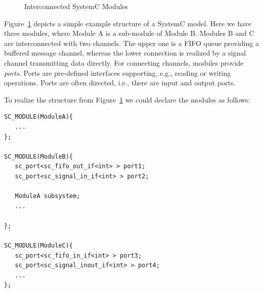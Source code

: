 \documentclass{template/openetcs_article}
\begin{document}
\begin{figure}
\begin{center}
\end{center}

\caption{Interconnected SystemC Modules}
\label{fig:modulestructure}
\end{figure}

Figure~\ref{fig:modulestructure} depicts a simple example structure of a SystemC model. Here we have three modules, where Module A is a sub-module of Module B. Modules B and C are interconnected with two channels. The upper one is a FIFO queue providing a buffered message channel, whereas the lower connection is realized by a signal channel transmitting data directly. For connecting channels, modules provide \emph{ports}. Ports are pre-defined interfaces supporting, e.g., reading or writing operations. Ports are often directed, i.e., there are input and output ports.

To realize the structure from Figure~\ref{fig:modulestructure} we could declare the modules as follows:

\lstset{language=C++, numbers=left, numberstyle=\tiny,showstringspaces=false} 
{\small
\begin{lstlisting}
SC_MODULE(ModuleA){
   ...
};

SC_MODULE(ModuleB){
   sc_port<sc_fifo_out_if<int> > port1;
   sc_port<sc_signal_in_if<int> > port2;

   ModuleA subsystem;
   ...

};

SC_MODULE(ModuleC){
   sc_port<sc_fifo_in_if<int> > port3;
   sc_port<sc_signal_inout_if<int> > port4;
   ...
};
\end{lstlisting}
}
\end{document}
